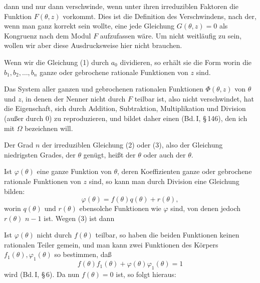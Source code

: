 dann und nur dann verschwinde, wenn unter ihren irreduziblen Faktoren die Funktion $F(\theta,z)$ vorkommt. Dies ist die Definition des Verschwindens, nach der, wenn man ganz korrekt sein wollte, eine jede Gleichung $G(\theta,z) = 0$ als Kongruenz nach dem Modul $F$ aufzufassen wäre. Um nicht weitläufig zu sein, wollen wir aber diese Ausdrucksweise hier nicht brauchen.

Wenn wir die Gleichung (1) durch $a_0$ dividieren, so erhält sie die Form
worin die $b_1, b_2, \ldots, b_n$ ganze oder gebrochene rationale Funktionen von $z$ sind.

Das System aller ganzen und gebrochenen rationalen Funktionen $\Phi(\theta,z)$ von $\theta$ und $z$, in denen der Nenner nicht durch $F$ teilbar ist, also nicht verschwindet, hat die Eigenschaft, sich durch Addition, Subtraktion, Multiplikation und Division (außer durch 0) zu reproduzieren, und bildet daher einen  (Bd.\,I, \S\,146), den ich mit $\Omega$ bezeichnen will.

Der Grad $n$ der irreduziblen Gleichung (2) oder (3), also der Gleichung niedrigsten Grades, der $\theta$ genügt, heißt der  $\theta$ oder auch der  $\theta$.

Ist $\varphi(\theta)$ eine ganze Funktion von $\theta$, deren Koeffizienten ganze oder gebrochene rationale Funktionen von $z$ sind, so kann man durch Division eine Gleichung bilden:
\[
\varphi(\theta) = f(\theta)q(\theta) + r(\theta),
\]
worin $q(\theta)$ und $r(\theta)$ ebensolche Funktionen wie $\varphi$ sind, von denen jedoch $r(\theta)$  $n-1$ ist. Wegen (3) ist dann

Ist $\varphi(\theta)$ nicht durch $f(\theta)$ teilbar, so haben die beiden Funktionen keinen rationalen Teiler gemein, und man kann zwei Funktionen des Körpers $f_1(\theta), \varphi_1(\theta)$ so bestimmen, daß
\[
f(\theta)f_1(\theta) + \varphi(\theta)\varphi_1(\theta) = 1
\]
wird (Bd.\,I, \S\,6). Da nun $f(\theta) = 0$ ist, so folgt hieraus:
